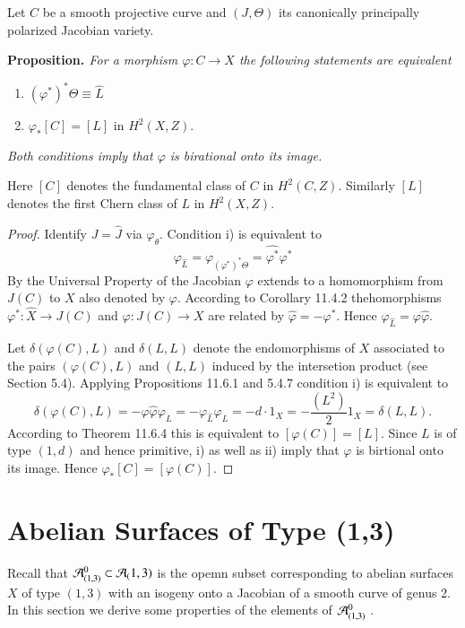 Let $C$ be a smooth projective curve and $(J, \Theta)$ its canonically principally polarized Jacobian variety.

\medskip
\noindent
{\bfseries {} Proposition. \label{chap11-prop-4.3}} \textit{For a morphism $\varphi : C \rightarrow X$ the following statements are equivalent}
\begin{enumerate}[{\it i)}]
\item $(\varphi^{*})^{*} \Theta \equiv \widehat{L}$

\item $\varphi_{*}[C] = [L]$ in $H^{2}(X, Z)$.
\end{enumerate}
\textit{Both conditions imply that $ \varphi$ is birational onto its image.}

Here $[C]$ denotes the fundamental class of $C$ in $H^{2}(C, Z)$. Similarly $[L]$ denotes the first Chern class of $L$ in $H^{2}(X, Z)$. 

\begin{proof}
Identify $J=\hat{J}$ via $\varphi_{\theta}$. Condition i) is equivalent to
$$
\varphi_{\hat{L}} = \varphi_{(\varphi^{*})^{*}\Theta} = \widehat{\varphi^{*}}\varphi^{*}
$$
By the Universal Property of the Jacobian $\varphi$ extends to a homomorphism from $J(C)$ to $X$ also denoted by $\varphi$. According to \cite{chap11-keyL-B} Corollary 11.4.2 the\pageoriginale homorphisms $\varphi^{*}: \widehat{X} \rightarrow J(C)$ and $\varphi : J(C) \rightarrow X$ are related by $\widehat{\varphi} =-\varphi^{*}$.
Hence $\varphi_{\widehat{L}} =\varphi\widehat{\varphi}$.

Let $\delta(\varphi(C), L)$ and $\delta(L, L)$ denote the endomorphisms of $X$ associated to the pairs $(\varphi(C), L)$ and $(L, L)$ induced by the intersetion product (see \cite{chap11-keyL-B} Section 5.4). Applying \cite{chap11-keyL-B} Propositions 11.6.1 and 5.4.7 condition i) is equivalent to
$$
\delta(\varphi(C), L) = -\varphi\widehat{\varphi}\varphi_{L} = -\varphi_{\widehat{L}}\varphi_{L} = -d \cdot 1_{X} = -\dfrac{(L^{2})}{2}1_{X} = \delta(L,L).
$$
According to \cite{chap11-keyL-B} Theorem 11.6.4 this is equivalent to $[\varphi(C)]= [L]$. Since $L$ is of type $(1,d)$ and
hence primitive, i) as well as ii) imply that $\varphi$ is birtional onto its image. Hence $\varphi_{*}[C]=[\varphi(C)]$.  
\end{proof}

\section{Abelian Surfaces of Type (1,3)}\label{chap11-sec-5}
Recall that $\mathcal{A}_{(1,3)}^{0} \subset \mathcal{A}_(1,3)$ is the opemn subset corresponding to abelian surfaces $X$ of type $(1,3)$ with an isogeny onto a Jacobian of a smooth curve of genus 2. In this section we derive some properties of the elements of $\mathcal{A}_{(1,3)}^{0}$ .


